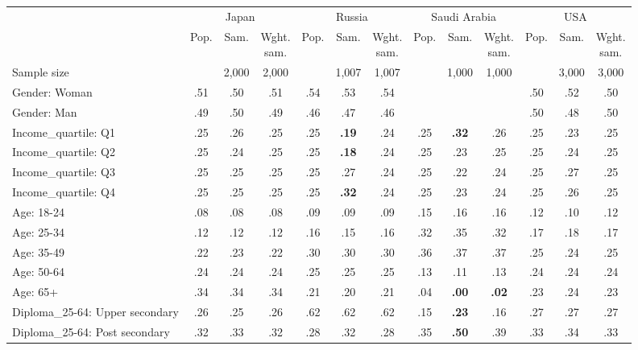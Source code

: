 
\begin{tabular}[t]{lcccccccccccc}
\toprule
\multicolumn{1}{c}{} & \multicolumn{3}{c}{Japan} & \multicolumn{3}{c}{Russia} & \multicolumn{3}{c}{Saudi Arabia} & \multicolumn{3}{c}{USA} \\
\cmidrule(l{3pt}r{3pt}){2-4} \cmidrule(l{3pt}r{3pt}){5-7} \cmidrule(l{3pt}r{3pt}){8-10} \cmidrule(l{3pt}r{3pt}){11-13}
  & Pop. & Sam. & \makecell{Wght.\\sam.} & Pop. & Sam. & \makecell{Wght.\\sam.} & Pop. & Sam. & \makecell{Wght.\\sam.} & Pop. & Sam. & \makecell{Wght.\\sam.}\\
\midrule
Sample size &  & 2,000 & 2,000 &  & 1,007 & 1,007 &  & 1,000 & 1,000 &  & 3,000 & 3,000\\
\addlinespace
Gender: Woman & .51 & .50 & .51 & .54 & .53 & .54 &  &  &  & .50 & .52 & .50\\
Gender: Man & .49 & .50 & .49 & .46 & .47 & .46 &  &  &  & .50 & .48 & .50\\
\addlinespace
Income\_quartile: Q1 & .25 & .26 & .25 & .25 & \textbf{.19} & .24 & .25 & \textbf{.32} & .26 & .25 & .23 & .25\\
Income\_quartile: Q2 & .25 & .24 & .25 & .25 & \textbf{.18} & .24 & .25 & .23 & .25 & .25 & .24 & .25\\
Income\_quartile: Q3 & .25 & .25 & .25 & .25 & .27 & .24 & .25 & .22 & .24 & .25 & .27 & .25\\
Income\_quartile: Q4 & .25 & .25 & .25 & .25 & \textbf{.32} & .24 & .25 & .23 & .24 & .25 & .26 & .25\\
\addlinespace
Age: 18-24 & .08 & .08 & .08 & .09 & .09 & .09 & .15 & .16 & .16 & .12 & .10 & .12\\
Age: 25-34 & .12 & .12 & .12 & .16 & .15 & .16 & .32 & .35 & .32 & .17 & .18 & .17\\
Age: 35-49 & .22 & .23 & .22 & .30 & .30 & .30 & .36 & .37 & .37 & .25 & .24 & .25\\
Age: 50-64 & .24 & .24 & .24 & .25 & .25 & .25 & .13 & .11 & .13 & .24 & .24 & .24\\
Age: 65+ & .34 & .34 & .34 & .21 & .20 & .21 & .04 & \textbf{.00} & \textbf{.02} & .23 & .24 & .23\\
\addlinespace
Diploma\_25-64: Upper secondary & .26 & .25 & .26 & .62 & .62 & .62 & .15 & \textbf{.23} & .16 & .27 & .27 & .27\\
Diploma\_25-64: Post secondary & .32 & .33 & .32 & .28 & .32 & .28 & .35 & \textbf{.50} & .39 & .33 & .34 & .33\\

\end{tabular}
